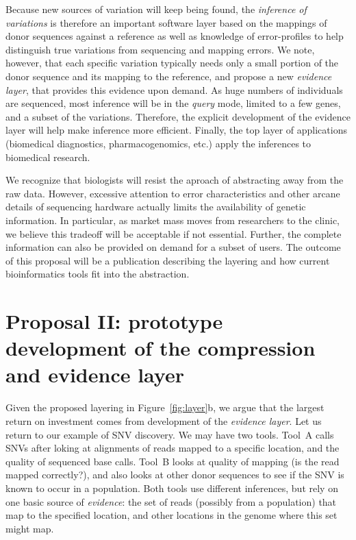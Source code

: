 \documentclass[11pt]{article}
\begin{document}
Because new sources of variation will keep being found, the
\emph{inference of variations} is therefore an important software
layer based on the mappings of donor sequences against a reference as
well as knowledge of error-profiles to help distinguish true
variations from sequencing and mapping errors. We note, however, that
each specific variation typically needs only a small portion of the
donor sequence and its mapping to the reference, and propose a new
\emph{evidence layer}, that provides this evidence upon demand. As
huge numbers of individuals are sequenced, most inference will be in
the \emph{query} mode, limited to a few genes, and a subset of the
variations. Therefore, the explicit development of the evidence layer
will help make inference more efficient. Finally, the top
layer of applications (biomedical diagnostics, pharmacogenomics, etc.)
apply the inferences to biomedical research.

We recognize that biologists will resist the aproach of abstracting
away from the raw data.  However, excessive attention to error
characteristics and other arcane details of sequencing hardware
actually limits the availability of genetic information. In
particular, as market mass moves from researchers to the clinic, we
believe this tradeoff will be acceptable if not essential. Further,
the complete information can also be provided on demand for a subset
of users. The outcome of this proposal will be a publication
describing the layering and how current bioinformatics tools fit into
the abstraction. 

\section{Proposal II: prototype development of the compression and evidence layer}
Given the proposed layering in Figure~\ref{fig:layer}b, we argue that
the largest return on investment comes from development of the
\emph{evidence layer}. Let us return to our example of SNV
discovery. We may have two tools. Tool~A calls SNVs after loking at
alignments of reads mapped to a specific location, and the quality of
sequenced base calls. Tool~B looks at quality of mapping (is the read
mapped correctly?), and also looks at other donor sequences to see if
the SNV is known to occur in a population. Both tools use different
inferences, but rely on one basic source of \emph{evidence}: the set
of reads (possibly from a population) that map to the specified
location, and other locations in the genome where this set might map.
\end{document}
